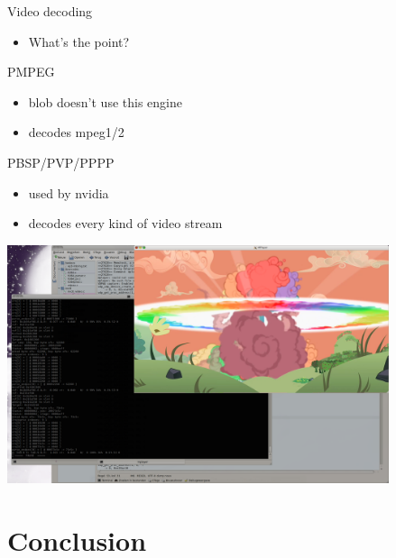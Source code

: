 \documentclass[11pt,english,compress]{beamer}
\begin{document}
		\begin{frame}
			\begin{block}{Video decoding}
				\begin{itemize}
					\item What's the point?
				\end{itemize}
			\end{block}

			\begin{block}{PMPEG}
				\begin{itemize}
					\item blob doesn't use this engine
					\item decodes mpeg1/2
				\end{itemize}
			\end{block}

			\begin{block}{PBSP/PVP/PPPP}
				\begin{itemize}
					\item used by nvidia
					\item decodes every kind of video stream
				\end{itemize}
			\end{block}
		\end{frame}

		\begin{frame}
			\begin{center}
				\includegraphics[height=7cm]{imgs/h264_vp_decoded2.png}
			\end{center}
		\end{frame}

\section{Conclusion}
\end{document}
